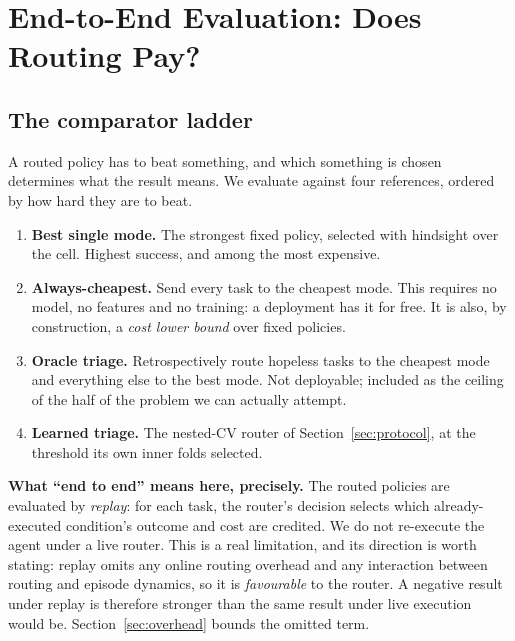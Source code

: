 \chapter{End-to-End Evaluation: Does Routing Pay?}
\label{ch:e2e}


\section{The comparator ladder}
\label{sec:comparators}

A routed policy has to beat something, and which something is chosen determines
what the result means. We evaluate against four references, ordered by how hard
they are to beat.

\begin{enumerate}[leftmargin=1.5em]
\item \textbf{Best single mode.} The strongest fixed policy, selected with
      hindsight over the cell. Highest success, and among the most expensive.
\item \textbf{Always-cheapest.} Send every task to the cheapest mode. This
      requires no model, no features and no training: a deployment has it for free. It is also, by construction, a \emph{cost lower bound} over fixed
      policies.
\item \textbf{Oracle triage.} Retrospectively route hopeless tasks to the
      cheapest mode and everything else to the best mode. Not deployable;
      included as the ceiling of the half of the problem we can actually attempt.
\item \textbf{Learned triage.} The nested-CV router of
      Section~\ref{sec:protocol}, at the threshold its own inner folds selected.
\end{enumerate}

\begin{scopebox}
\textbf{What ``end to end'' means here, precisely.} The routed policies are
evaluated by \emph{replay}: for each task, the router's decision selects which
already-executed condition's outcome and cost are credited. We do not re-execute
the agent under a live router. This is a real limitation, and its direction is worth stating: replay omits any online routing overhead and any interaction
between routing and episode dynamics, so it is \emph{favourable} to the router.
A negative result under replay is therefore stronger than the same result under
live execution would be. Section~\ref{sec:overhead} bounds the omitted term.
\end{scopebox}

